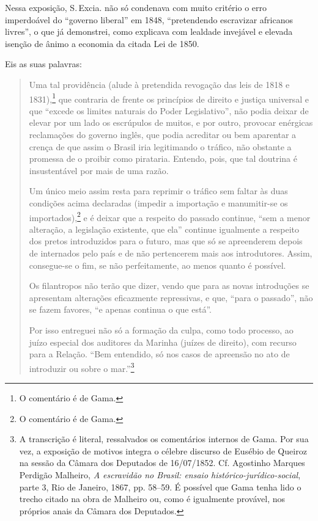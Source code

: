 {Nessa exposição, S.\,Excia. não só condenava com muito critério o erro
imperdoável do ``governo liberal'' em 1848, ``pretendendo escravizar
africanos livres'', o que já demonstrei, como explicava com lealdade
invejável e elevada isenção de ânimo a economia da citada Lei de 1850.

Eis as suas palavras:

\begin{quote}
Uma tal providência (alude à pretendida revogação das leis de 1818 e
1831),\footnote{O comentário é de Gama.} que contraria de frente os
princípios de direito e justiça universal e que ``excede os limites
naturais do Poder Legislativo'', não podia deixar de elevar por um lado
os escrúpulos de muitos, e por outro, provocar enérgicas reclamações do
governo inglês, que podia acreditar ou bem aparentar a crença de que
assim o Brasil iria legitimando o tráfico, não obstante a promessa de o
proibir como pirataria. Entendo, pois, que tal doutrina é insustentável
por mais de uma razão.

Um único meio assim resta para reprimir o tráfico sem faltar às duas
condições acima declaradas (impedir a importação e manumitir-se os
importados),\footnote{O comentário é de Gama.} e é deixar que a
respeito do passado continue, ``sem a menor alteração, a legislação
existente, que ela'' continue igualmente a respeito dos pretos
introduzidos para o futuro, mas que só se apreenderem depois de
internados pelo país e de não pertencerem mais aos introdutores. Assim,
consegue-se o fim, se não perfeitamente, ao menos quanto é possível.

\noindent\dotfill{}

Os filantropos não terão que dizer, vendo que para as novas introduções
se apresentam alterações eficazmente repressivas, e que, ``para o
passado'', não se fazem favores, ``e apenas continua o que está''.

\noindent\dotfill{}

Por isso entreguei não só a formação da culpa, como todo processo, ao
juízo especial dos auditores da Marinha (juízes de direito), com recurso
para a Relação. ``Bem entendido, só nos casos de apreensão no ato de
introduzir ou sobre o mar.''\footnote{A transcrição é literal,
  ressalvados os comentários internos de Gama. Por sua vez, a exposição
  de motivos integra o célebre discurso de Eusébio de Queiroz na sessão
  da Câmara dos Deputados de 16/07/1852. Cf. Agostinho Marques Perdigão
Malheiro, \emph{A escravidão no Brasil: ensaio histórico-jurídico-social},
parte 3, Rio de Janeiro, 1867, pp. 58--59. É possível que Gama tenha lido o trecho
  citado na obra de Malheiro ou, como é igualmente provável, nos
  próprios anais da Câmara dos Deputados.}
\end{quote}  

}
